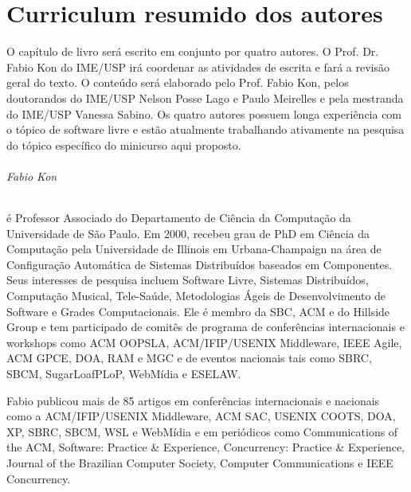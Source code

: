 \newpage{}





\newpage{}


\setcounter{page}{1} %



\part*{Curriculum resumido dos autores}

O capítulo de livro será escrito em conjunto por quatro autores. O
Prof. Dr. Fabio Kon do IME/USP irá coordenar as atividades de escrita
e fará a revisão geral do texto. O conteúdo será elaborado pelo Prof.
Fabio Kon, pelos doutorandos do IME/USP Nelson Posse Lago e Paulo
Meirelles e pela mestranda do IME/USP Vanessa Sabino. Os quatro autores
possuem longa experiência com o tópico de software livre e estão atualmente
trabalhando ativamente na pesquisa do tópico específico do minicurso
aqui proposto.


\paragraph{Fabio Kon}

é Professor Associado do Departamento de Ciência da Computação da
Universidade de São Paulo.
%
Em 2000, recebeu grau de PhD em Ciência da Computação pela
Universidade de Illinois em Urbana-Champaign na área de Configuração
Automática de Sistemas Distribuídos baseados em Componentes.
%
Seus interesses de pesquisa incluem Software Livre, Sistemas
Distribuídos, Computação Musical, Tele-Saúde, Metodologias Ágeis de
Desenvolvimento de Software e Grades Computacionais.
%
Ele é membro da SBC, ACM e do Hillside Group e tem participado de
comitês de programa de conferências internacionais e workshops como
ACM OOPSLA, ACM/IFIP/USENIX Middleware, IEEE Agile, ACM GPCE, DOA, RAM
e MGC e de eventos nacionais tais como SBRC, SBCM, SugarLoafPLoP,
WebMídia e ESELAW.

Fabio publicou mais de 85 artigos em conferências internacionais e
nacionais como a ACM/IFIP/USENIX Middleware, ACM SAC, USENIX COOTS,
DOA, XP, SBRC, SBCM, WSL e WebMídia e em periódicos como
Communications of the ACM, Software: Practice \& Experience,
Concurrency: Practice \& Experience, Journal of the Brazilian Computer
Society, Computer Communications e IEEE Concurrency.

